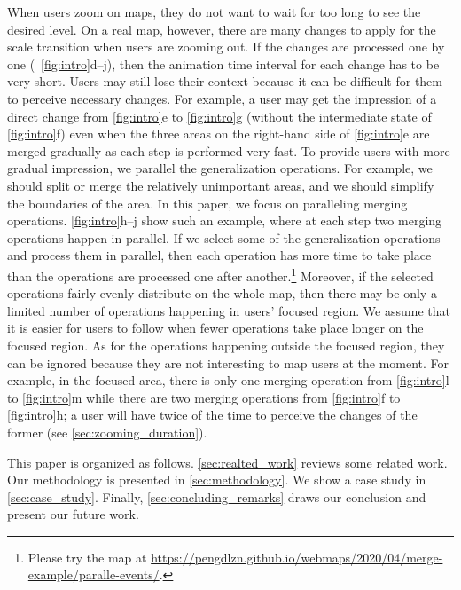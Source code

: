 \documentclass[ijgi,article,submit,moreauthors,pdftex]{Definitions/mdpi}
\begin{document}
When users zoom on maps, 
they do not want to wait for too long to see the desired level.
On a real map, however, 
there are many changes to apply for the scale transition 
when users are zooming out.
If the changes are processed one by one 
(\eg~\figs\ref{fig:intro}d--j),
then the animation time interval for each change has to be very short.
Users may still lose their context 
because it can be difficult for them to perceive necessary changes.
For example, a user may get the impression of
a direct change from \fig\ref{fig:intro}e to \fig\ref{fig:intro}g
(without the intermediate state of \fig\ref{fig:intro}f)
even when the three areas on the right-hand side of \fig\ref{fig:intro}e
are merged gradually as each step is performed very fast.
To provide users with more gradual impression, 
we parallel the generalization operations.
For example, we should split or merge the relatively unimportant areas,
and we should simplify the boundaries of the area.
In this paper, we focus on paralleling merging operations.
\figs\ref{fig:intro}h--j show such an example,
where at each step two merging operations happen in parallel.
If we select some of the generalization operations
and process them in parallel,
then each operation has more time to take place 
than the operations are processed one after another.\footnote{%
Please try the map at
\url{https://pengdlzn.github.io/webmaps/2020/04/merge-example/paralle-events/}.}
Moreover, if the selected operations
fairly evenly distribute on the whole map, 
then there may be only a limited number of operations 
happening in users' focused region.
We assume that it is easier for users to follow 
when fewer operations take place longer on the focused region.
As for the operations happening outside the focused region,
they can be ignored because 
they are not interesting to map users at the moment.
For example, in the focused area, there is only one merging operation 
from \fig\ref{fig:intro}l to \fig\ref{fig:intro}m
while there are two merging operations  
from \fig\ref{fig:intro}f to \fig\ref{fig:intro}h;
a user will have twice of the time to perceive the changes of the former
(see \sect\ref{sec:zooming_duration}).

This paper is organized as follows.
\sect\ref{sec:realted_work} reviews some related work.
Our methodology is presented in \sect\ref{sec:methodology}.
We show a case study in \sect\ref{sec:case_study}.
Finally, \sect\ref{sec:concluding_remarks} draws our conclusion
and present our future work.



 
\end{document}
